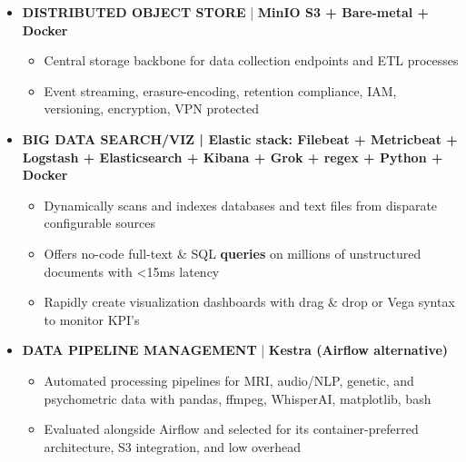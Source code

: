 \documentclass[10pt,a4paper,ragged2e]{altacv}
\begin{document}
\begin{fullwidth}
\begin{itemize}[label={}]
    \item \textbf{DISTRIBUTED OBJECT STORE} | \textbf{MinIO S3 + Bare-metal + Docker} 
        \begin{itemize}[label={-}, noitemsep]
            \item Central storage backbone for data collection endpoints and ETL processes
            \item Event streaming, erasure-encoding, retention compliance, IAM, versioning, encryption, VPN protected
        \end{itemize}
    
    \item \textbf{BIG DATA SEARCH/VIZ | Elastic stack: Filebeat + Metricbeat + Logstash + Elasticsearch + Kibana + Grok + regex + Python + Docker}
        \begin{itemize}[label={-},noitemsep]
            \item Dynamically scans and indexes databases and text files from disparate configurable sources
            \item Offers no-code full-text \& SQL \textbf{queries} on millions of unstructured documents with <15ms latency
            \item Rapidly create visualization dashboards with drag \& drop or Vega syntax to monitor KPI's 
        \end{itemize}
        
    \item \textbf{DATA PIPELINE MANAGEMENT} | \textbf{Kestra (Airflow alternative)}
        \begin{itemize}[label={-}, noitemsep] 
            \item Automated processing pipelines for MRI, audio/NLP, genetic, and psychometric data with pandas, ffmpeg, WhisperAI, matplotlib, bash 
            \item Evaluated alongside Airflow and selected for its container-preferred architecture, S3 integration, and low overhead
        \end{itemize}
        

\end{itemize}
\end{fullwidth}
\end{document}
